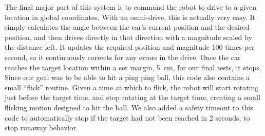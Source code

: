 \documentclass[letterpaper, 11pt]{article}
\begin{document}
The final major part of this system is to command the robot to drive to a given location in global coordinates. With an omni-drive, this is actually very easy. It simply calculates the angle between the car's current position and the desired position, and then drives directly in that direction with a magnitude scaled by the distance left. It updates the required position and magnitude 100 times per second, so it continuously corrects for any errors in the drive. Once the car reaches the target location within a set margin, \SI{5}{\centi\meter}, for our final tests, it stops. Since our goal was to be able to hit a ping ping ball, this code also contains a small ``flick'' routine. Given a time at which to flick, the robot will start rotating just before the target time, and stop rotating at the target time, creating a small flicking motion designed to hit the ball. We also added a safety timeout to this code to automatically stop if the target had not been reached in 2 seconds, to stop runaway behavior.

\begin{mdframed}[backgroundcolor=bg]
    \inputminted[breaklines]{c}{files/excerpts/goToTarget.c}
\end{mdframed}
\end{document}
